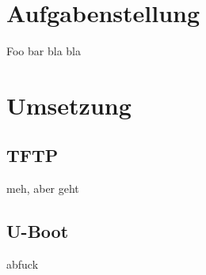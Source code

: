 \documentclass[11pt,twoside,a4paper]{article}
\begin{document}


\clearpage
\setcounter{page}{1}
\tableofcontents

\section{Aufgabenstellung}
\setcounter{page}{1}
Foo bar bla bla

\section{Umsetzung}
\subsection{TFTP}
meh, aber geht
\subsection{U-Boot}
abfuck
\end{document}
